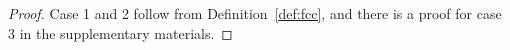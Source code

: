 \documentclass[twoside,11pt]{article}
\begin{document}
\begin{proof}
  Case 1 and 2 follow from Definition~\ref{def:fcc}, and there is a
  proof for case 3 in the supplementary materials.



\end{proof}
\end{document}
